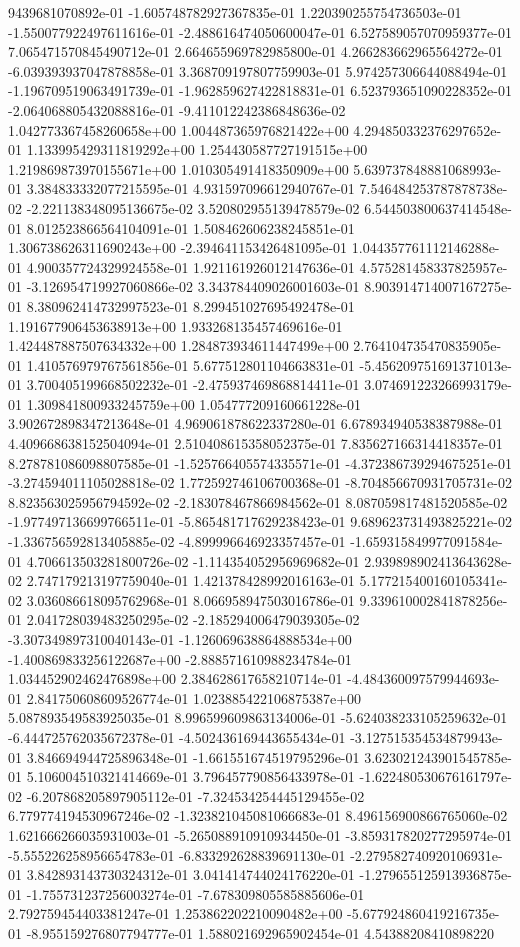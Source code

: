 9439681070892e-01	-1.605748782927367835e-01	1.220390255754736503e-01	-1.550077922497611616e-01	-2.488616474050600047e-01	6.527589057070959377e-01	7.065471570845490712e-01	2.664655969782985800e-01	4.266283662965564272e-01	-6.039393937047878858e-01	3.368709197807759903e-01	5.974257306644088494e-01	-1.196709519063491739e-01	-1.962859627422818831e-01	6.523793651090228352e-01	-2.064068805432088816e-01	-9.411012242386848636e-02	1.042773367458260658e+00	1.004487365976821422e+00	4.294850332376297652e-01	1.133995429311819292e+00	1.254430587727191515e+00	1.219869873970155671e+00	1.010305491418350909e+00	5.639737848881068993e-01	3.384833332077215595e-01	4.931597096612940767e-01	7.546484253787878738e-02	-2.221138348095136675e-02	3.520802955139478579e-02	6.544503800637414548e-01	8.012523866564104091e-01	1.508462606238245851e-01	1.306738626311690243e+00	-2.394641153426481095e-01	1.044357761112146288e-01	4.900357724329924558e-01	1.921161926012147636e-01	4.575281458337825957e-01	-3.126954719927060866e-02	3.343784409026001603e-01	8.903914714007167275e-01	8.380962414732997523e-01	8.299451027695492478e-01	1.191677906453638913e+00	1.933268135457469616e-01	1.424487887507634332e+00	1.284873934611447499e+00	2.764104735470835905e-01	1.410576979767561856e-01	5.677512801104663831e-01	-5.456209751691371013e-01	3.700405199668502232e-01	-2.475937469868814411e-01	3.074691223266993179e-01	1.309841800933245759e+00	1.054777209160661228e-01	3.902672898347213648e-01	4.969061878622337280e-01	6.678934940538387988e-01	4.409668638152504094e-01	2.510408615358052375e-01	7.835627166314418357e-01	8.278781086098807585e-01	-1.525766405574335571e-01	-4.372386739294675251e-01	-3.274594011105028818e-02	1.772592746106700368e-01	-8.704856670931705731e-02	8.823563025956794592e-02	-2.183078467866984562e-01	8.087059817481520585e-02	-1.977497136699766511e-01	-5.865481717629238423e-01	9.689623731493825221e-02	-1.336756592813405885e-02	-4.899996646923357457e-01	-1.659315849977091584e-01	4.706613503281800726e-02	-1.114354052956969682e-01	2.939898902413643628e-02	2.747179213197759040e-01	1.421378428992016163e-01	5.177215400160105341e-02	3.036086618095762968e-01	8.066958947503016786e-01	9.339610002841878256e-01	2.041728039483250295e-02	-2.185294006479039305e-02	-3.307349897310040143e-01	-1.126069638864888534e+00	-1.400869833256122687e+00	-2.888571610988234784e-01	1.034452902462476898e+00	2.384628617658210714e-01	-4.484360097579944693e-01	2.841750608609526774e-01	1.023885422106875387e+00	5.087893549583925035e-01	8.996599609863134006e-01	-5.624038233105259632e-01	-6.444725762035672378e-01	-4.502436169443655434e-01	-3.127515354534879943e-01	3.846694944725896348e-01	-1.661551674519795296e-01	3.623021243901545785e-01	5.106004510321414669e-01	3.796457790856433978e-01	-1.622480530676161797e-02	-6.207868205897905112e-01	-7.324534254445129455e-02	6.779774194530967246e-02	-1.323821045081066683e-01	8.496156900866765060e-02	1.621666266035931003e-01	-5.265088910910934450e-01	-3.859317820277295974e-01	-5.555226258956654783e-01	-6.833292628839691130e-01	-2.279582740920106931e-01	3.842893143730324312e-01	3.041414744024176220e-01	-1.279655125913936875e-01	-1.755731237256003274e-01	-7.678309805585885606e-01	2.792759454403381247e-01	1.253862202210090482e+00	-5.677924860419216735e-01	-8.955159276807794777e-01	1.588021692965902454e-01	4.54388208410898220